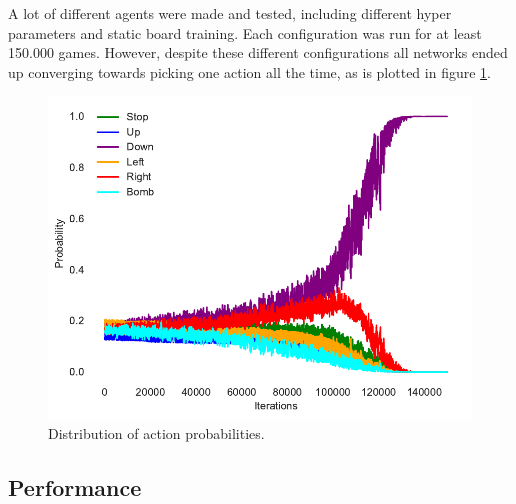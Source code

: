A lot of different agents were made and tested, including different hyper parameters and static board training. Each configuration was run for at least 150.000 games. However, despite these different configurations all networks ended up converging towards picking one action all the time, as is plotted in figure \ref{fig:act}. 

\begin{figure}[htb]
    \centerline{\includegraphics[width=1.0\linewidth]{pommerman/plots/a_probs.pdf}}
    \caption{Distribution of action probabilities.}\label{fig:act}
\end{figure}








\subsection{Performance}

